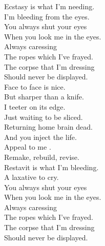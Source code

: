 Ecstasy is what I'm needing. \\
I'm bleeding from the eyes. \\
You always shut your eyes \\
When you look me in the eyes. \\

Always caressing \\
The ropes which I've frayed. \\
The corpse that I'm dressing \\
Should never be displayed. \\

Face to face is nice. \\
But sharper than a knife. \\
I teeter on its edge. \\
Just waiting to be sliced. \\
Returning home brain dead. \\
And you inject the life. \\
Appeal to me . \\
Remake, rebuild, revise. \\

Restavit is what I'm bleeding. \\
A laxative to cry. \\
You always shut your eyes \\
When you look me in the eyes. \\

Always caressing \\
The ropes which I've frayed. \\
The corpse that I'm dressing \\
Should never be displayed. \\




